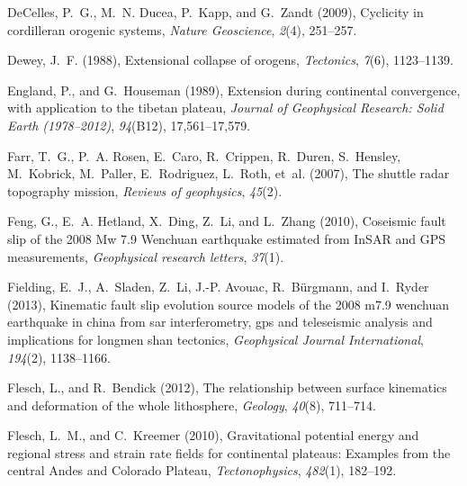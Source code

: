 \documentclass[twocolumn,jgrga]{AGUTeX}
\begin{document}
\begin{article}
{{\begin{thebibliography}{87}
DeCelles, P.~G., M.~N. Ducea, P.~Kapp, and G.~Zandt (2009), Cyclicity in
  cordilleran orogenic systems, \textit{Nature Geoscience}, \textit{2}(4),
  251--257.

Dewey, J.~F. (1988), Extensional collapse of orogens, \textit{Tectonics},
  \textit{7}(6), 1123--1139.

England, P., and G.~Houseman (1989), Extension during continental convergence,
  with application to the tibetan plateau, \textit{Journal of Geophysical
  Research: Solid Earth (1978--2012)}, \textit{94}(B12), 17,561--17,579.

Farr, T.~G., P.~A. Rosen, E.~Caro, R.~Crippen, R.~Duren, S.~Hensley,
  M.~Kobrick, M.~Paller, E.~Rodriguez, L.~Roth, et~al. (2007), The shuttle
  radar topography mission, \textit{Reviews of geophysics}, \textit{45}(2).

Feng, G., E.~A. Hetland, X.~Ding, Z.~Li, and L.~Zhang (2010), Coseismic fault
  slip of the 2008 {M}w 7.9 {W}enchuan earthquake estimated from {I}n{S}{A}{R}
  and {G}{P}{S} measurements, \textit{Geophysical research letters},
  \textit{37}(1).

Fielding, E.~J., A.~Sladen, Z.~Li, J.-P. Avouac, R.~B{\"u}rgmann, and I.~Ryder
  (2013), Kinematic fault slip evolution source models of the 2008 m7.9
  wenchuan earthquake in china from sar interferometry, gps and teleseismic
  analysis and implications for longmen shan tectonics, \textit{Geophysical
  Journal International}, \textit{194}(2), 1138--1166.

Flesch, L., and R.~Bendick (2012), The relationship between surface kinematics
  and deformation of the whole lithosphere, \textit{Geology}, \textit{40}(8),
  711--714.

Flesch, L.~M., and C.~Kreemer (2010), Gravitational potential energy and
  regional stress and strain rate fields for continental plateaus: {E}xamples
  from the central {A}ndes and {C}olorado {P}lateau, \textit{Tectonophysics},
  \textit{482}(1), 182--192.


\end{thebibliography}}}
\end{article}
\end{document}
